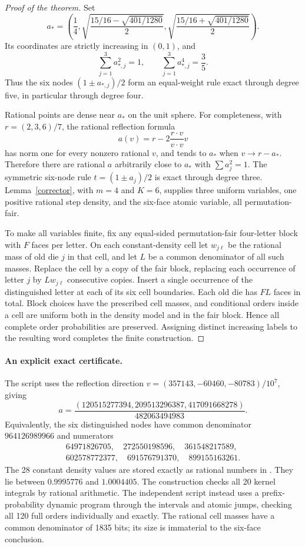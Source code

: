 \documentclass[11pt]{article}
\begin{document}
\begin{proof}[Proof of the theorem]
Set
\[
 a_* =\left(\frac14,
 \sqrt{\frac{15/16-\sqrt{401/1280}}2},
 \sqrt{\frac{15/16+\sqrt{401/1280}}2}\right).
\]
Its coordinates are strictly increasing in $(0,1)$, and
\[
 \sum_{j=1}^3 a_{*,j}^2=1,
 \qquad \sum_{j=1}^3a_{*,j}^4=\frac35.
\]
Thus the six nodes $(1\pm a_{*,j})/2$ form an equal-weight rule
exact through degree five, in particular through degree four.

Rational points are dense near $a_*$ on the unit sphere.
For completeness, with $r=(2,3,6)/7$, the rational reflection formula
\[
 a(v)=r-2\frac{r\cdot v}{v\cdot v}v
\]
has norm one for every nonzero rational $v$, and tends to $a_*$ when
$v\to r-a_*$. Therefore there are rational $a$ arbitrarily close to
$a_*$ with $\sum a_j^2=1$. The symmetric six-node rule
$t=(1\pm a_j)/2$ is exact through degree three.
Lemma~\ref{corrector}, with $m=4$ and $K=6$, supplies three uniform
variables, one positive rational step density, and the six-face atomic
variable, all permutation-fair.

To make all variables finite, fix any equal-sided permutation-fair
four-letter block with $F$ faces per letter.
On each constant-density cell let $w_{j\ell}$ be the rational mass
of old die $j$ in that cell, and let $L$ be a common denominator of
all such masses. Replace the cell by a copy of the fair block, replacing
each occurrence of letter $j$ by $Lw_{j\ell}$ consecutive copies.
Insert a single occurrence of the distinguished letter at each of its
six cell boundaries. Each old die has $FL$ faces in total.
Block choices have the prescribed cell masses, and conditional orders
inside a cell are uniform both in the density model and in the fair
block. Hence all complete order probabilities are preserved.
Assigning distinct increasing labels to the resulting word completes
the finite construction.
\end{proof}

\paragraph{An explicit exact certificate.}
The script  uses the reflection
direction $v=(357143,-60460,-80783)/10^7$, giving
\[
 a=\frac{(120515277394,209513296387,417091668278)}{482063494983}.
\]
Equivalently, the six distinguished nodes have common denominator
$964126989966$ and numerators
\[
\begin{gathered}
 64971826705,\quad272550198596,\quad361548217589,\\
 602578772377,\quad691576791370,\quad899155163261.
\end{gathered}
\]
The 28 constant density values are stored exactly as rational numbers
in .
They lie between $0.9995776$ and $1.0004405$.
The construction checks all 20 kernel integrals by rational arithmetic.
The independent script  instead
uses a prefix-probability dynamic program through the intervals and
atomic jumps, checking all 120 full orders individually and exactly.
The rational cell masses have a common denominator of 1835 bits;
its size is immaterial to the six-face conclusion.
\end{document}
